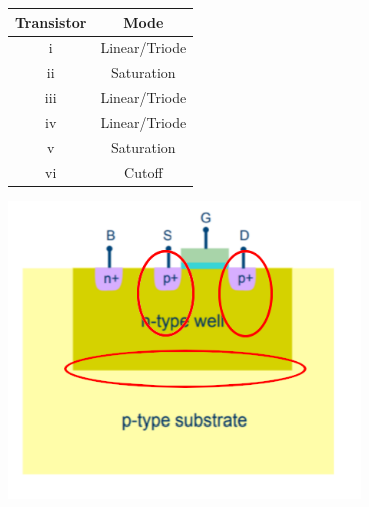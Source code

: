 \documentclass{article}
\begin{document}
\question{}

\begin{subparts}
  \item
  \begin{tabular}{c|c}
    Transistor & Mode \\
    \hline
    i & Linear/Triode \\
    ii & Saturation \\
    iii & Linear/Triode \\
    iv & Linear/Triode \\
    v & Saturation \\
    vi & Cutoff
  \end{tabular}
  \item
  \begin{center}
    \includegraphics[width=0.7\textwidth]{q4-b.png}
  \end{center}
\end{subparts}
\end{document}
